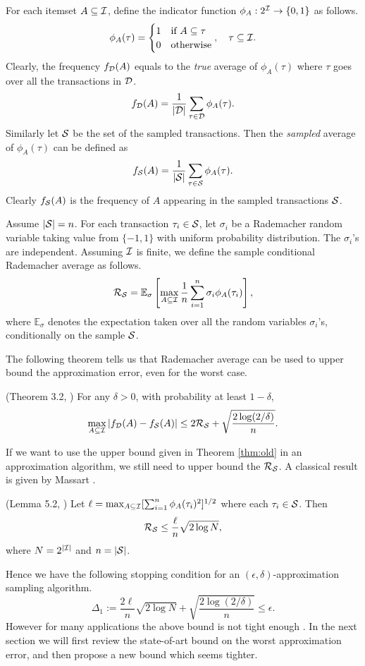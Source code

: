 \documentclass{article}
\begin{document}
For each itemset $A\subseteq\mathcal{I}$, define the indicator function $\phi_A : 2^{\mathcal{I}} \to \{0, 1\}$ as follows.
$$\phi_A(\tau) = \begin{cases}
1 & \textrm{if $A\subseteq \tau$}\\
0 & \textrm{otherwise}\\
\end{cases},\quad
\tau\subseteq\mathcal{I}.$$
Clearly, the frequency $f_{\mathcal{D}}(A)$ equals to the \emph{true} average of $\phi_A(\tau)$ where $\tau$ goes over all the transactions in $\mathcal{D}$.
$$f_{\mathcal{D}}(A) = \frac{1}{|\mathcal{D}|} \sum_{\tau\in\mathcal{D}} \phi_A(\tau).$$
Similarly let $\mathcal{S}$ be the set of the sampled transactions. Then the \emph{sampled} average of $\phi_A(\tau)$ can be defined as
$$f_{\mathcal{S}}(A) = \frac{1}{|\mathcal{S}|} \sum_{\tau\in\mathcal{S}} \phi_A(\tau).$$
Clearly $f_{\mathcal{S}}(A)$ is the frequency of $A$ appearing in the sampled transactions $\mathcal{S}$.

Assume $|\mathcal{S}| = n$. For each transaction $\tau_i \in \mathcal{S}$, let $\sigma_i$ be a Rademacher random variable taking value from $\{-1, 1\}$ with uniform probability distribution. The $\sigma_i$'s are independent. Assuming $\mathcal{I}$ is finite, we define the sample conditional Rademacher average as follows.
$$\mathcal{R}_{\mathcal{S}} = \mathbb{E}_\sigma \left[\max_{A\subseteq\mathcal{I}}\frac{1}{n}\sum_{i=1}^n \sigma_i\phi_A(\tau_i)\right],$$
where $\mathbb{E}_\sigma$ denotes the expectation taken over all the random variables $\sigma_i$'s, conditionally on the sample $\mathcal{S}$. 

The following theorem tells us that Rademacher average can be used to upper bound the approximation error, even for the worst case.

\begin{theorem}
\label{thm:old}
(Theorem 3.2, \cite{BBL05}) For any $\delta>0$, with probability at least $1-\delta$,
$$\max_{A\subseteq\mathcal{I}} |f_{\mathcal{D}}(A) - f_{\mathcal{S}}(A)|\leq 2\mathcal{R}_{\mathcal{S}} + \sqrt{\frac{2\log(2/\delta)}{n}}.$$
\end{theorem}

If we want to use the upper bound given in Theorem \ref{thm:old} in an approximation algorithm, we still need to upper bound the $\mathcal{R}_{\mathcal{S}}$. A classical result is given by Massart \cite{Mas00}.

\begin{theorem}
\label{thm:massart}
(Lemma 5.2, \cite{Mas00}) Let $\ell = \max_{A\subseteq\mathcal{I}} [\sum_{i=1}^n\phi_A(\tau_i)^2]^{1/2}$ where each $\tau_i\in\mathcal{S}$. Then
$$\mathcal{R}_{\mathcal{S}} \leq \frac{\ell}{n}\sqrt{2\log N},$$
where $N = 2^{|\mathcal{I}|}$ and $n = |\mathcal{S}|$.
\end{theorem}
Hence we have the following stopping condition for an $(\epsilon,\delta)$-approximation sampling algorithm.
$$\Delta_1 := \frac{2\ell}{n}\sqrt{2\log N} + \sqrt{\frac{2\log(2/\delta)}{n}} \leq \epsilon.$$
However for many applications the above bound is not tight enough \cite{RU15,RU16}. In the next section we will first review the state-of-art bound on the worst approximation error, and then propose a new bound which seems tighter.
\end{document}
